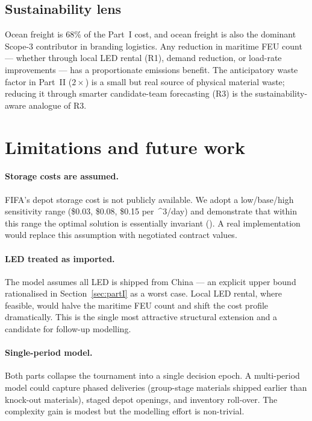 \documentclass[11pt,a4paper]{article}
\numberwithin{equation}{section}
\newcommand{\USD}[1]{\$#1}
\newcommand{\mcube}{\text{m}^{3}}
\begin{document}
\subsection{Sustainability lens}

Ocean freight is 68\% of the Part~I cost, and ocean freight is also the dominant Scope-3 contributor in branding logistics. Any reduction in maritime FEU count — whether through local LED rental (R1), demand reduction, or load-rate improvements — has a proportionate emissions benefit. The anticipatory waste factor in Part~II ($2\times$) is a small but real source of physical material waste; reducing it through smarter candidate-team forecasting (R3) is the sustainability-aware analogue of R3.

\section{Limitations and future work}\label{sec:limitations}

\paragraph{Storage costs are assumed.} FIFA's depot storage cost is not publicly available. We adopt a low/base/high sensitivity range (\USD{0.03}, \USD{0.08}, \USD{0.15} per~\mcube/day) and demonstrate that within this range the optimal solution is essentially invariant (). A real implementation would replace this assumption with negotiated contract values.

\paragraph{LED treated as imported.} The model assumes all LED is shipped from China — an explicit upper bound rationalised in Section~\ref{sec:partI} as a worst case. Local LED rental, where feasible, would halve the maritime FEU count and shift the cost profile dramatically. This is the single most attractive structural extension and a candidate for follow-up modelling.

\paragraph{Single-period model.} Both parts collapse the tournament into a single decision epoch. A multi-period model could capture phased deliveries (group-stage materials shipped earlier than knock-out materials), staged depot openings, and inventory roll-over. The complexity gain is modest but the modelling effort is non-trivial.
\end{document}
